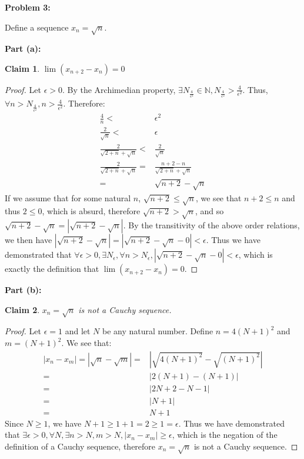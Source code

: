 \documentclass{article}
\newcommand{\nats}{\ensuremath{\mathbb{N}}}
\newcommand{\eps}{\ensuremath{\epsilon}}
\newtheorem{clm}{Claim}
\begin{document}
\textbf{Problem 3:}

Define a sequence $x_n = \sqrt{n}$.

\medskip
\textbf{Part (a):}

\begin{clm}
	$\lim(x_{n+2} - x_n) = 0$
\end{clm}

\begin{proof}
	Let $\eps > 0$.
	By the Archimedian property,
	$\exists N_{\frac{4}{\eps^2}} \in \nats, N_{\frac{4}{\eps^2}} > \frac{4}{\eps^2}$.
	Thus, $\forall n > N_{\frac{4}{\eps^2}}, n > \frac{4}{\eps^2}$.
	Therefore:
	\begin{align}
		\frac{4}{n} < & \eps^2 \\
		\frac{2}{\sqrt{n}} < & \eps \\
		\frac{2}{\sqrt{2 + n} + \sqrt{n}} < & \frac{2}{\sqrt{n}} \\
		\frac{2}{\sqrt{2 + n} + \sqrt{n}} = & \frac{n + 2 - n}{\sqrt{2 + n} + \sqrt{n}}  \\
		= & \sqrt{n + 2} - \sqrt{n}
	\end{align}
	If we assume that for some natural $n$,
	$\sqrt{n + 2} \le \sqrt{n}$,
	we see that $n + 2 \le n$ and thus $2 \le 0$,
	which is absurd,
	therefore $\sqrt{n + 2} > \sqrt{n}$,
	and so $\sqrt{n + 2} - \sqrt{n} = |\sqrt{n + 2} - \sqrt{n}|$.
	By the transitivity of the above order relations,
	we then have $|\sqrt{n + 2} - \sqrt{n}| = 
	|\sqrt{n + 2} - \sqrt{n} - 0| < \eps$.
	Thus we have demonstrated
	that $\forall \eps > 0,
	\exists N_\eps,
	\forall n > N_\eps,
	|\sqrt{n + 2} - \sqrt{n} - 0| < \eps$,
	which is exactly the definition that
	$\lim(x_{n+2} - x_n) = 0$.
\end{proof}

\textbf{Part (b):}

\begin{clm}
	$x_n = \sqrt{n}$ is not a Cauchy sequence.
\end{clm}

\begin{proof}
	Let $\eps = 1$ and let $N$ be any natural number.
	Define $n = 4(N + 1)^2$ and $m = (N + 1)^2$.
	We see that:
	\begin{align}
		|x_n - x_m| = | \sqrt{n} - \sqrt{m}| = 	 &|\sqrt{4(N + 1)^2} - \sqrt{(N + 1)^2}| \\
							=& | 2(N + 1) - (N + 1)| \\
							=& | 2N + 2 - N - 1 | \\
							=& | N + 1 | \\
							=&  N + 1
	\end{align}
	Since $N \geq 1$, we have $N + 1 \geq 1 + 1 = 2 \geq 1 = \eps$.
	Thus we have demonstrated that
	$\exists \eps > 0, \forall N, \exists n > N, m > N, |x_n - x_m| \geq \eps$,
	which is the negation of the definition of a Cauchy sequence,
	therefore $x_n = \sqrt{n}$ is not a Cauchy sequence.
\end{proof}
\end{document}
